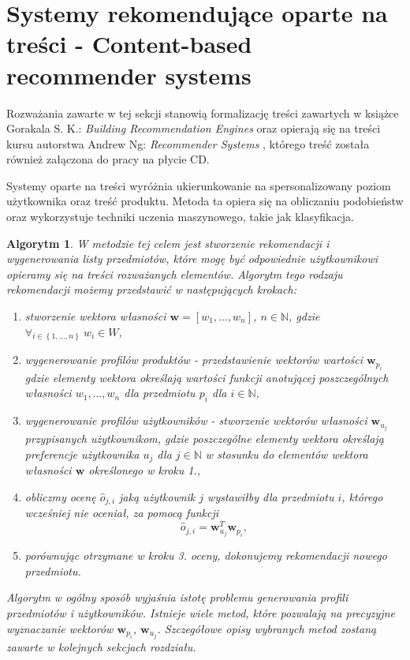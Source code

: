 \documentclass[12pt,a4paper]{report}
\newtheorem{algorytm}[df]{Algorytm}
\newcommand{\set}[1]{\left\lbrace {#1} \right\rbrace}
\newcommand{\setN}{\mathbb{N}}
\newcommand{\setWlasnosci}{\mathit{W}}
\begin{document}
\section{Systemy rekomendujące oparte na treści - Content-based recommender systems}
Rozważania zawarte w tej sekcji stanowią formalizację treści zawartych w książce Gorakala S. K.: \textit{Building Recommendation Engines} {\citep[Sec 3]{bre}} oraz opierają się na treści kursu autorstwa Andrew Ng: \textit{Recommender Systems} {\citep{rs}}, którego treść została również załączona do pracy na płycie CD.
\bigskip

Systemy oparte na treści wyróżnia ukierunkowanie na spersonalizowany poziom użytkownika oraz treść produktu. Metoda ta opiera się na obliczaniu podobieństw oraz wykorzystuje techniki uczenia maszynowego, takie jak klasyfikacja.

\begin{algorytm}
W metodzie tej celem jest stworzenie rekomendacji i wygenerowania listy przedmiotów, które mogę być odpowiednie użytkownikowi opieramy się na treści rozważanych elementów. Algorytm tego rodzaju rekomendacji możemy przedstawić w następujących krokach:
\begin{enumerate}
\item stworzenie wektora własności $\mathbf{w} = [w_1, \ldots, w_n]$, $n \in \setN$, gdzie $\forall_{i \in \set{1, \ldots, n}} \: w_i \in \setWlasnosci$,

\item wygenerowanie profilów produktów - przedstawienie wektorów wartości $\mathbf{w}_{p_i}$ gdzie elementy wektora określają wartości funkcji anotującej poszczególnych własności $w_1, \ldots, w_n$ dla przedmiotu $p_i$ dla $i \in \setN$,

\item wygenerowanie profilów użytkowników - stworzenie wektorów własności $\mathbf{w}_{u_j}$ przypisanych użytkownikom, gdzie poszczególne elementy wektora określają preferencje użytkownika $u_j$ dla $j \in \setN$ w stosunku do elementów wektora własności $\mathbf{w}$ określonego w kroku 1.,

\item obliczmy ocenę $\widehat{o}_{j,i}$ jaką użytkownik $j$ wystawiłby dla przedmiotu $i$, którego wcześniej nie oceniał, za pomocą funkcji
$$
\widehat{o}_{j,i} = \mathbf{w}_{u_j}^T \mathbf{w}_{p_i},
$$

\item porównując otrzymane w kroku 3. oceny, dokonujemy rekomendacji nowego przedmiotu.
\end{enumerate}

Algorytm w ogólny sposób wyjaśnia istotę problemu generowania profili przedmiotów i użytkowników.
Istnieje wiele metod, które pozwalają na precyzyjne wyznaczanie wektorów $\mathbf{w}_{p_i}$, $\mathbf{w}_{u_j}$.
Szczegółowe opisy wybranych metod zostaną zawarte w kolejnych sekcjach rozdziału.
\end{algorytm}
\end{document}
